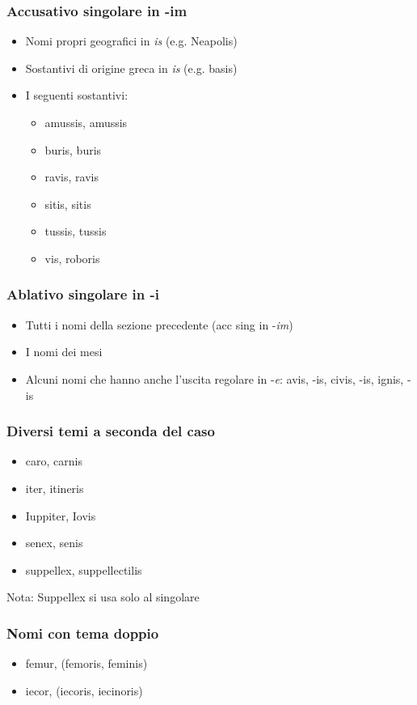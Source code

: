 \subsubsection*{Accusativo singolare in -im}
\begin{itemize}
    \item Nomi propri geografici in \textit{is} (e.g. Neapolis)
    \item Sostantivi di origine greca in \textit{is} (e.g. basis)
    \item I seguenti sostantivi:
    \begin{itemize}
        \item amussis, amussis
        \item buris, buris
        \item ravis, ravis
        \item sitis, sitis
        \item tussis, tussis
        \item vis, roboris
    \end{itemize}
\end{itemize}

\subsubsection*{Ablativo singolare in -i}
\begin{itemize}
    \item Tutti i nomi della sezione precedente (acc sing in -\textit{im})
    \item I nomi dei mesi
    \item Alcuni nomi che hanno anche l'uscita regolare in -\textit{e}: avis, -is, civis, -is, ignis, -is
\end{itemize}

\subsubsection*{Diversi temi a seconda del caso}
\begin{itemize}
    \item caro, carnis
    \item iter, itineris
    \item Iuppiter, Iovis
    \item senex, senis
    \item suppellex, suppellectilis
\end{itemize}
Nota: Suppellex si usa solo al singolare

\subsubsection*{Nomi con tema doppio}
\begin{itemize}
    \item femur, (femoris, feminis)
    \item iecor, (iecoris, iecinoris)
\end{itemize}

